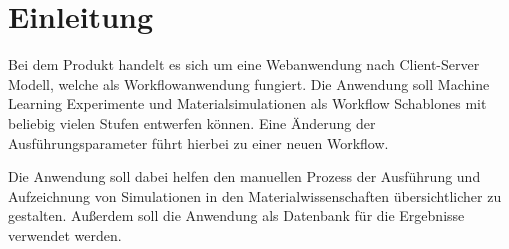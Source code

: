 \chapter{Einleitung}
Bei dem Produkt handelt es sich um eine Webanwendung nach  \gls{Client-Server} Modell, welche als Workflowanwendung fungiert. Die Anwendung soll \gls{Machine Learning} Experimente und Materialsimulationen als \glspl{Workflow Schablone} mit beliebig vielen Stufen entwerfen können. Eine Änderung der Ausführungsparameter führt hierbei zu einer neuen \gls{Workflow}.

Die Anwendung soll dabei helfen den manuellen Prozess der Ausführung und Aufzeichnung von Simulationen in den Materialwissenschaften übersichtlicher zu gestalten. Außerdem soll die Anwendung als Datenbank für die Ergebnisse verwendet werden.
